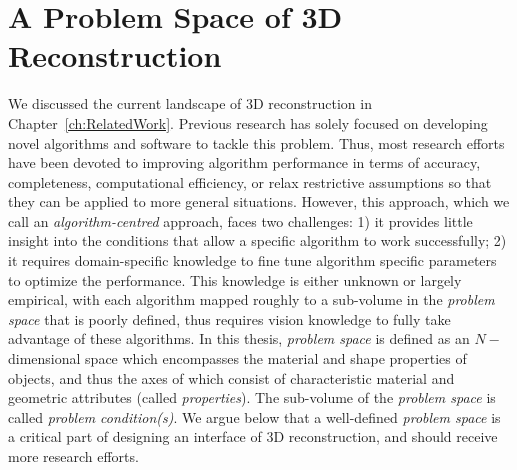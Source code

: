 
\chapter{A Problem Space of 3D Reconstruction}
\label{ch:3DRecon_ProbSpace}
We discussed the current landscape of 3D reconstruction in Chapter~\ref{ch:RelatedWork}. Previous research has solely focused on developing novel algorithms and software to tackle this problem. Thus, most research efforts have been devoted to improving algorithm performance in terms of accuracy, completeness, computational efficiency, or relax restrictive assumptions so that they can be applied to more general situations. However, this approach, which we call an \textit{algorithm-centred} approach, faces two challenges: 1) it provides little insight into the conditions that allow a specific algorithm to work successfully; 2) it requires domain-specific knowledge to fine tune algorithm specific parameters to optimize the performance. This knowledge is either unknown or largely empirical, with each algorithm mapped roughly to a sub-volume in the \textit{problem space} that is poorly defined, thus requires vision knowledge to fully take advantage of these algorithms. In this thesis, \textit{problem space} is defined as an $N-$dimensional space which encompasses the material and shape properties of objects, and thus the axes of which consist of characteristic material and geometric attributes (called \textit{properties}). The sub-volume of the \textit{problem space} is called \textit{problem condition(s)}. We argue below that a well-defined \textit{problem space} is a critical part of designing an interface of 3D reconstruction, and should receive more research efforts.


